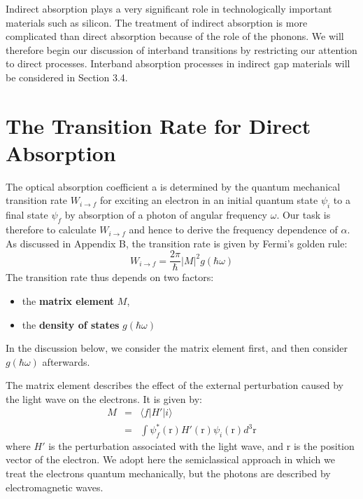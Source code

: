 \documentclass[12pt]{book}
\begin{document}
Indirect absorption plays a very significant role in technologically important materials such as silicon. The treatment of indirect absorption is more complicated than direct absorption because of the role of the phonons. We will therefore begin our discussion of interband transitions by restricting our attention to direct processes. Interband absorption processes in indirect gap materials will be considered in Section 3.4.

\section{The Transition Rate for Direct Absorption}

The optical absorption coefficient a is determined by the quantum mechanical transition rate $W_{i\rightarrow f}$ for exciting an electron in an initial quantum state $\psi_i$ to a final state $\psi_f$ by absorption of a photon of angular frequency $\omega$. Our task is therefore to calculate $W_{i\rightarrow f}$ and hence to derive the frequency dependence of $\alpha$. As discussed in Appendix B, the transition rate is given by Fermi's golden rule:
\begin{equation}\label{equa:3.2}
  W_{i\rightarrow f}=\frac{2\pi}{\hbar}|M|^2g(\hbar\omega)
\end{equation}
The transition rate thus depends on two factors:
\begin{itemize}
  \item the \textbf{matrix element} $M$,
  \item the \textbf{density of states} $g(\hbar\omega)$
\end{itemize}
In the discussion below, we consider the matrix element first, and then consider $g(\hbar\omega)$ afterwards.

The matrix element describes the effect of the external perturbation caused by the light wave on the electrons. It is given by:
\begin{eqnarray}
  M &=& \langle f|H'|i\rangle \\
   &=& \int \psi_f^*(\mathrm{r})H'(\mathrm{r})\psi_i(\mathrm{r})d^3\mathrm{r}
\end{eqnarray}
where $H'$ is the perturbation associated with the light wave, and $\mathrm{r}$ is the position vector of the electron. We adopt here the semiclassical approach in which we treat the electrons quantum mechanically, but the photons are described by electromagnetic waves.
\end{document}

